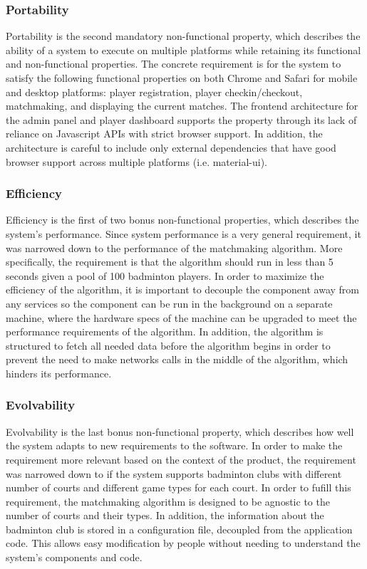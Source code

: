 \documentclass{article}
\begin{document}
\subsubsection{Portability}
Portability is the second mandatory non-functional property, which describes the ability of a system to execute on multiple platforms while retaining its functional and non-functional properties. The concrete requirement is for the system to satisfy the following functional properties on both Chrome and Safari for mobile and desktop platforms: player registration, player checkin/checkout, matchmaking, and displaying the current matches. The frontend architecture for the admin panel and player dashboard supports the property through its lack of reliance on Javascript APIs with strict browser support. In addition, the architecture is careful to include only external dependencies that have good browser support across multiple platforms (i.e. material-ui).

\subsubsection{Efficiency}
Efficiency is the first of two bonus non-functional properties, which describes the system's performance. Since system performance is a very general requirement, it was narrowed down to the performance of the matchmaking algorithm. More specifically, the requirement is that the algorithm should run in less than 5 seconds given a pool of 100 badminton players. In order to maximize the efficiency of the algorithm, it is important to decouple the component away from any services so the component can be run in the background on a separate machine, where the hardware specs of the machine can be upgraded to meet the performance requirements of the algorithm. In addition, the algorithm is structured to fetch all needed data before the algorithm begins in order to prevent the need to make networks calls in the middle of the algorithm, which hinders its performance.

\subsubsection{Evolvability}
Evolvability is the last bonus non-functional property, which describes how well the system adapts to new requirements to the software. In order to make the requirement more relevant based on the context of the product, the requirement was narrowed down to if the system supports badminton clubs with different number of courts and different game types for each court. In order to fufill this requirement, the matchmaking algorithm is designed to be agnostic to the number of courts and their types. In addition, the information about the badminton club is stored in a configuration file, decoupled from the application code. This allows easy modification by people without needing to understand the system's components and code.
\end{document}
